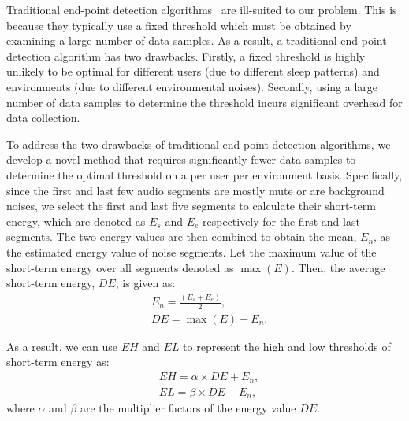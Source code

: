  Traditional end-point detection algorithms~\cite{stowell2015detection} are
ill-suited to our problem. This is because they typically use a fixed threshold which must be obtained by examining a large number of data
samples. As a result, a traditional end-point detection algorithm has two drawbacks. Firstly, a fixed threshold is highly unlikely to be
optimal for different users (due to different sleep patterns) and environments (due to different environmental noises). Secondly, using a
large number of data samples to determine the threshold incurs significant overhead for data collection.


To address the two drawbacks of traditional end-point detection algorithms, we develop a novel method that requires significantly fewer
data samples to determine the optimal threshold on a per user per environment basis.
%
%
Specifically, since the first and last few audio segments are mostly mute or are background noises, we select the first and last five
segments to calculate their short-term energy, which are denoted as $E_s$ and $E_e$ respectively for the first and last segments. The two
energy values are then combined to obtain the mean, $E_n$, as the estimated energy value of noise segments. Let the maximum value of the
short-term energy over all segments denoted as $\max (E)$. Then, the average short-term energy, $DE$, is given as:
\begin{eqnarray}
      &E_n = \frac{(E_s+E_e)}{2}, \\
      &DE = \max (E)-E_n.\label{eq:DE}
\end{eqnarray}

As a result, we can use $EH$ and $EL$ to represent the high and low thresholds of short-term energy as:
\begin{eqnarray}
      &EH=\alpha \times DE+E_n,\\
      &EL=\beta \times DE+E_n,
\end{eqnarray}
where $\alpha$ and $\beta$ are the multiplier factors of the energy value $DE$.


